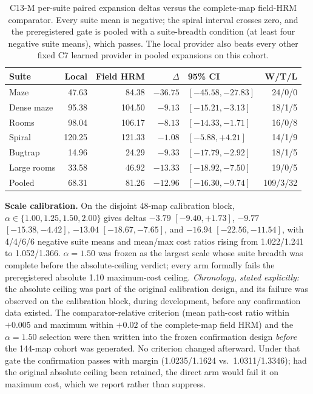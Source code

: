 \documentclass[letterpaper]{article} %
\newcommand{\stage}[1]{\textsc{#1}}
\begin{document}
\begin{table}[t]
\centering
\small
\setlength{\tabcolsep}{2.5pt}
\begin{tabular}{@{}lrrrlr@{}}
\toprule
Suite & Local & Field HRM & $\Delta$ & 95\% CI & W/T/L \\
\midrule
Maze & 47.63 & 84.38 & $-36.75$ & $[-45.58,-27.83]$ & 24/0/0 \\
Dense maze & 95.38 & 104.50 & $-9.13$ & $[-15.21,-3.13]$ & 18/1/5 \\
Rooms & 98.04 & 106.17 & $-8.13$ & $[-14.33,-1.71]$ & 16/0/8 \\
Spiral & 120.25 & 121.33 & $-1.08$ & $[-5.88,+4.21]$ & 14/1/9 \\
Bugtrap & 14.96 & 24.29 & $-9.33$ & $[-17.79,-2.92]$ & 18/1/5 \\
Large rooms & 33.58 & 46.92 & $-13.33$ & $[-18.92,-7.50]$ & 19/0/5 \\
\midrule
Pooled & 68.31 & 81.26 & $-12.96$ & $[-16.30,-9.74]$ & 109/3/32 \\
\bottomrule
\end{tabular}
\caption{\stage{C13-M} per-suite paired expansion deltas versus the complete-map field-HRM comparator. Every suite mean is negative; the spiral interval crosses zero, and the preregistered gate is pooled with a suite-breadth condition (at least four negative suite means), which passes. The local provider also beats every other fixed \stage{C7} learned provider in pooled expansions on this cohort.}
\label{tab:c13msuite}
\end{table}

\textbf{Scale calibration.} On the disjoint 48-map calibration block, $\alpha\in\{1.00,1.25,1.50,2.00\}$ gives deltas $-3.79$ $[-9.40,+1.73]$, $-9.77$ $[-15.38,-4.42]$, $-13.04$ $[-18.67,-7.65]$, and $-16.94$ $[-22.56,-11.54]$, with 4/4/6/6 negative suite means and mean/max cost ratios rising from 1.022/1.241 to 1.052/1.366. $\alpha{=}1.50$ was frozen as the largest scale whose suite breadth was complete before the absolute-ceiling verdict; every arm formally fails the preregistered absolute 1.10 maximum-cost ceiling. \emph{Chronology, stated explicitly:} the absolute ceiling was part of the original calibration design, and its failure was observed on the calibration block, during development, before any confirmation data existed. The comparator-relative criterion (mean path-cost ratio within $+0.005$ and maximum within $+0.02$ of the complete-map field HRM) and the $\alpha{=}1.50$ selection were then written into the frozen confirmation design \emph{before} the 144-map cohort was generated. No criterion changed afterward. Under that gate the confirmation passes with margin (1.0235/1.1624 vs.\ 1.0311/1.3346); had the original absolute ceiling been retained, the direct arm would fail it on maximum cost, which we report rather than suppress.
\end{document}
